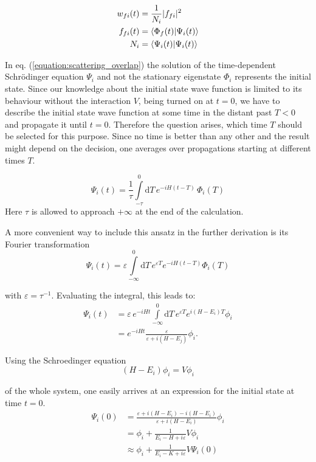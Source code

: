 \begin{align}
  w_{fi}(t) &= \frac 1{N_i} |f_{fi}|^2 \\
  f_{fi}(t) &= \braket{\Phi_f(t)|\Psi_i(t)} \label{equation:scattering_overlap}\\
  N_i       &= \braket{\Psi_i(t)|\Psi_i(t)}
\end{align}

In eq. (\ref{equation:scattering_overlap}) the solution of the time-dependent 
Schrödinger equation $\Psi_i$ and not the stationary eigenstate $\Phi_i$
represents the initial state. Since our knowledge
about the initial state wave function is limited to its behaviour without the
interaction $V$, being turned on at $t=0$, we have to describe the initial state
wave function at some time in the distant past $T<0$ and propagate it until $t=0$.
Therefore the question arises, which time $T$ should be selected for this purpose.
Since no time is better than any other and the result might depend on the decision,
one averages over propagations starting at different times $T$.

\begin{equation}
  \Psi_i(t) = \frac 1\tau \int\limits_{-\tau}^0 \mathrm{d}T \,
              e^{-iH(t-T)} \, \Phi_i(T)
\end{equation}
Here $\tau$ is allowed to approach $+\infty$ at the end of the calculation.

A more convenient way to include this ansatz in the further derivation
is its Fourier transformation
\begin{equation}
  \Psi_i(t) = \varepsilon \int\limits_{-\infty}^0 \mathrm{d}T \,
              e^{\varepsilon T} e^{-iH(t-T)} \Phi_i(T)
\end{equation}

with $\varepsilon = \tau^{-1}$. Evaluating the integral, this leads to:
\begin{align}
   \Psi_i(t) &= \varepsilon \, e^{-iHt} \int\limits_{-\infty}^0 \mathrm{d}T \,
                e^{\varepsilon T} e^{i(H-E_i)T} \phi_i\\
             &= e^{-iHt} \frac{\varepsilon}{\varepsilon+i(H-E_j)} \phi_i .
\end{align}

Using the Schroedinger equation
\begin{equation}
  (H-E_i) \phi_i = V \phi_i
\end{equation}

of the whole system, one easily arrives at an expression for the initial state
at time $t=0$.
\begin{align}
  \Psi_i(0) &= \frac{\varepsilon + i(H-E_i) - i(H-E_i)}{\varepsilon + i(H-E_i)} \phi_i\\
            &= \phi_i + \frac{1}{E_i-H+i\varepsilon} V \phi_i \label{equation:in_state_0}\\
            &\approx \phi_i + \frac{1}{E_i-K+i\varepsilon} V \Psi_i(0) \label{equation:in_state_0_approx}
\end{align}

